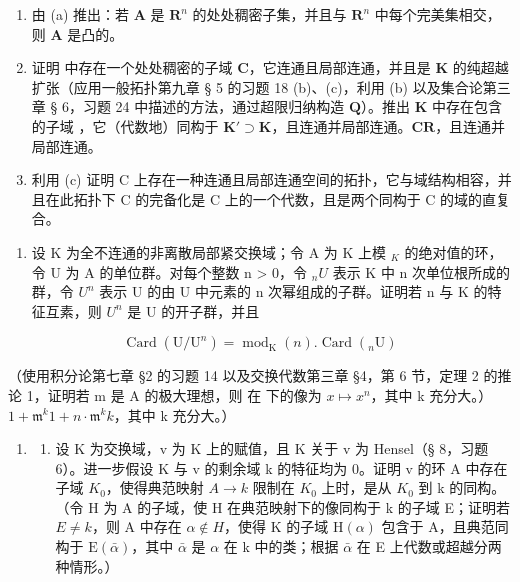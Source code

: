 \begin{enumerate}
\def\labelenumi{(\alph{enumi})}
\setcounter{enumi}{1}
\item
  由 (a) 推出：若 \(\mathbf{A}\) 是 \(\mathbf{R}^n\) 的处处稠密子集，并且与 \(\mathbf{R}^n\) 中每个完美集相交，则 \(\mathbf{A}\) 是凸的。
\item
  证明  中存在一个处处稠密的子域 \(\mathbf{C}\)，它连通且局部连通，并且是 \(\mathbf{K}\) 的纯超越扩张（应用一般拓扑第九章 § 5 的习题 18 (b)、(c)，利用 (b) 以及集合论第三章 § 6，习题 24 中描述的方法，通过超限归纳构造 \(\mathbf{Q}\)）。推出 \(\mathbf{K}\) 中存在包含  的子域 ，它（代数地）同构于 \(\mathbf{K}' \supset \mathbf{K}\)，且连通并局部连通。\(\mathbf{C}\)\(\mathbf{R}\)，且连通并局部连通。
\item
  利用 (c) 证明 C 上存在一种连通且局部连通空间的拓扑，它与域结构相容，并且在此拓扑下 C 的完备化是 C 上的一个代数，且是两个同构于 C 的域的直复合。
\end{enumerate}

\begin{enumerate}
\def\labelenumi{\arabic{enumi}.}
\setcounter{enumi}{2}
\tightlist
\item
  设 K 为全不连通的非离散局部紧交换域；令 A 为 K 上模 \(_{K}\) 的绝对值的环，令 U 为 A 的单位群。对每个整数 n \textgreater{} 0，令 \(_{n}U\) 表示 K 中 n 次单位根所成的群，令 \(U^{n}\) 表示 U 的由 U 中元素的 n 次幂组成的子群。证明若 n 与 K 的特征互素，则 \(U^{n}\) 是 U 的开子群，并且
\end{enumerate}

\[
\operatorname{Card} (\mathrm{U} / \mathrm{U} ^ {n}) = \operatorname{mod} _ {\mathrm{K}} (n). \operatorname{Card} (_ {n} \mathrm{U})
\]

（使用积分论第七章 §2 的习题 14 以及交换代数第三章 §4，第 6 节，定理 2 的推论 1，证明若 m 是 A 的极大理想，则  在  下的像为 \(x \mapsto x^n\)，其中 k 充分大。）\(1 + \mathfrak{m}^k\)\(1 + n \cdot \mathfrak{m}^k\)\(k\)，其中 k 充分大。）

\begin{enumerate}
\def\labelenumi{\arabic{enumi}.}
\setcounter{enumi}{3}
\tightlist
\item
  \begin{enumerate}
  \def\labelenumii{(\alph{enumii})}
  \tightlist
  \item
    设 K 为交换域，v 为 K 上的赋值，且 K 关于 v 为 Hensel（§ 8，习题 6）。进一步假设 K 与 v 的剩余域 k 的特征均为 0。证明 v 的环 A 中存在子域 \(K_{0}\)，使得典范映射 \(A \rightarrow k\) 限制在 \(K_{0}\) 上时，是从 \(K_{0}\) 到 k 的同构。（令 H 为 A 的子域，使 H 在典范映射下的像同构于 k 的子域 E；证明若 \(E \neq k\)，则 A 中存在 \(\alpha \notin H\)，使得 K 的子域 \(\mathrm{H}(\alpha)\) 包含于 A，且典范同构于 \(\mathrm{E}(\bar{\alpha})\)，其中 \(\bar{\alpha}\) 是 \(\alpha\) 在 k 中的类；根据 \(\bar{\alpha}\) 在 E 上代数或超越分两种情形。）
  \end{enumerate}
\end{enumerate}

